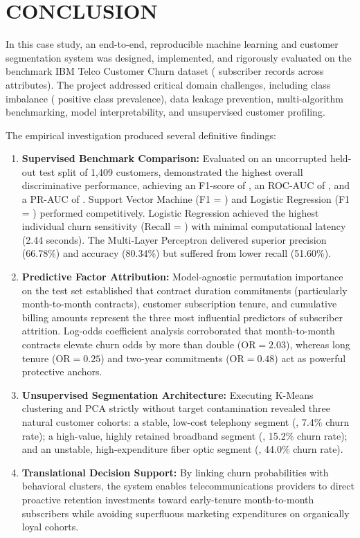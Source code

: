 \chapter{CONCLUSION}

In this case study, an end-to-end, reproducible machine learning and customer segmentation system was designed, implemented, and rigorously evaluated on the benchmark IBM Telco Customer Churn dataset (\datasetTotalRows{} subscriber records across \datasetTotalCols{} attributes). The project addressed critical domain challenges, including class imbalance (\datasetChurnProportion{} positive class prevalence), data leakage prevention, multi-algorithm benchmarking, model interpretability, and unsupervised customer profiling.

The empirical investigation produced several definitive findings:
\begin{enumerate}
    \item \textbf{Supervised Benchmark Comparison:} Evaluated on an uncorrupted held-out test split of 1,409 customers, \textbf{\bestModelName{}} demonstrated the highest overall discriminative performance, achieving an F1-score of \textbf{\bestModelFOne{}}, an ROC-AUC of \textbf{\bestModelRocAuc{}}, and a PR-AUC of \textbf{\bestModelPrAuc{}}. Support Vector Machine (F1 = \SupportVectorMachineFOne{}) and Logistic Regression (F1 = \LogisticRegressionFOne{}) performed competitively. Logistic Regression achieved the highest individual churn sensitivity (Recall = \LogisticRegressionRec{}) with minimal computational latency (2.44 seconds). The Multi-Layer Perceptron delivered superior precision (66.78\%) and accuracy (80.34\%) but suffered from lower recall (51.60\%).
    \item \textbf{Predictive Factor Attribution:} Model-agnostic permutation importance on the test set established that contract duration commitments (particularly month-to-month contracts), customer subscription tenure, and cumulative billing amounts represent the three most influential predictors of subscriber attrition. Log-odds coefficient analysis corroborated that month-to-month contracts elevate churn odds by more than double ($\text{OR} = 2.03$), whereas long tenure ($\text{OR} = 0.25$) and two-year commitments ($\text{OR} = 0.48$) act as powerful protective anchors.
    \item \textbf{Unsupervised Segmentation Architecture:} Executing K-Means clustering and PCA strictly without target contamination revealed three natural customer cohorts: a stable, low-cost telephony segment (\clusterZeroName{}, 7.4\% churn rate); a high-value, highly retained broadband segment (\clusterOneName{}, 15.2\% churn rate); and an unstable, high-expenditure fiber optic segment (\clusterTwoName{}, 44.0\% churn rate).
    \item \textbf{Translational Decision Support:} By linking churn probabilities with behavioral clusters, the system enables telecommunications providers to direct proactive retention investments toward early-tenure month-to-month subscribers while avoiding superfluous marketing expenditures on organically loyal cohorts.
\end{enumerate}

